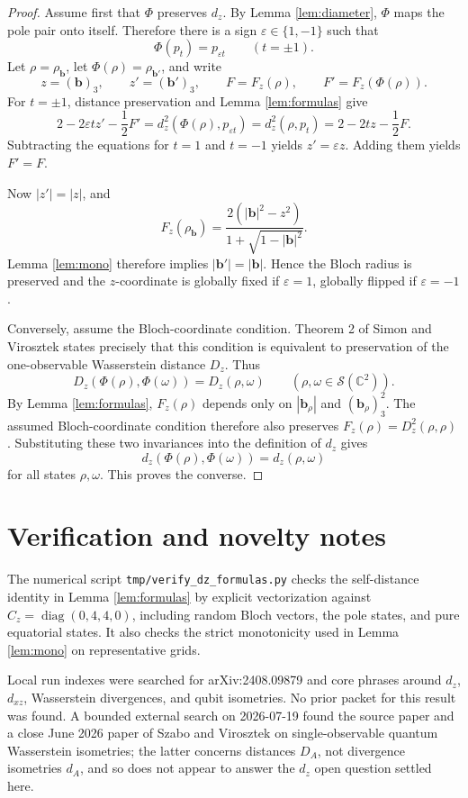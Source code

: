 \documentclass[11pt]{amsart}
\newcommand{\C}{\mathbb C}
\newcommand{\cS}{\mathcal S}
\newcommand{\diag}{\operatorname{diag}}
\newcommand{\eps}{\varepsilon}
\newcommand{\bb}{\mathbf b}
\newcommand{\om}{\omega}
\begin{document}
\begin{proof}
Assume first that \(\Phi\) preserves \(d_z\).  By Lemma \ref{lem:diameter},
\(\Phi\) maps the pole pair onto itself.  Therefore there is a sign
\(\eps\in\{1,-1\}\) such that
\[
  \Phi(p_t)=p_{\eps t}\qquad(t=\pm1).
\]
Let \(\rho=\rho_{\bb}\), let \(\Phi(\rho)=\rho_{\bb'}\), and write
\[
  z=(\bb)_3,\qquad z'=(\bb')_3,\qquad
  F=F_z(\rho),\qquad F'=F_z(\Phi(\rho)).
\]
For \(t=\pm1\), distance preservation and Lemma \ref{lem:formulas} give
\[
  2-2\eps t z'-\frac12F'
  =d_z^2(\Phi(\rho),p_{\eps t})
  =d_z^2(\rho,p_t)
  =2-2tz-\frac12F.
\]
Subtracting the equations for \(t=1\) and \(t=-1\) yields \(z'=\eps z\).
Adding them yields \(F'=F\).

Now \(|z'|=|z|\), and
\[
  F_z(\rho_{\bb})
  =\frac{2(|\bb|^2-z^2)}{1+\sqrt{1-|\bb|^2}}.
\]
Lemma \ref{lem:mono} therefore implies \(|\bb'|=|\bb|\).  Hence the Bloch
radius is preserved and the \(z\)-coordinate is globally fixed if
\(\eps=1\), globally flipped if \(\eps=-1\).

Conversely, assume the Bloch-coordinate condition.  Theorem 2 of Simon and
Virosztek states precisely that this condition is equivalent to preservation
of the one-observable Wasserstein distance \(D_z\).  Thus
\[
  D_z(\Phi(\rho),\Phi(\om))=D_z(\rho,\om)
  \qquad(\rho,\om\in\cS(\C^2)).
\]
By Lemma \ref{lem:formulas}, \(F_z(\rho)\) depends only on \(|\bb_\rho|\) and
\((\bb_\rho)_3^2\).  The assumed Bloch-coordinate condition therefore also
preserves \(F_z(\rho)=D_z^2(\rho,\rho)\).  Substituting these two invariances
into the definition of \(d_z\) gives
\[
  d_z(\Phi(\rho),\Phi(\om))=d_z(\rho,\om)
\]
for all states \(\rho,\om\).  This proves the converse.
\end{proof}

\section{Verification and novelty notes}

The numerical script \texttt{tmp/verify\_dz\_formulas.py} checks the
self-distance identity in Lemma \ref{lem:formulas} by explicit vectorization
against \(C_z=\diag(0,4,4,0)\), including random Bloch vectors, the pole
states, and pure equatorial states.  It also checks the strict monotonicity
used in Lemma \ref{lem:mono} on representative grids.

Local run indexes were searched for arXiv:2408.09879 and core phrases around
\(d_z\), \(d_{xz}\), Wasserstein divergences, and qubit isometries.  No prior
packet for this result was found.  A bounded external search on 2026-07-19
found the source paper and a close June 2026 paper of Szabo and Virosztek on
single-observable quantum Wasserstein isometries; the latter concerns
distances \(D_A\), not divergence isometries \(d_A\), and so does not appear to
answer the \(d_z\) open question settled here.
\end{document}
